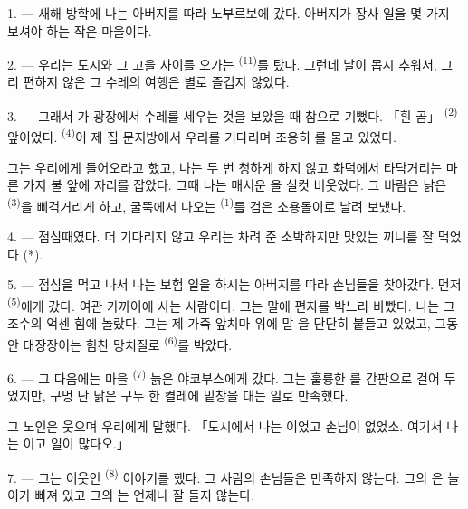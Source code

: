 \VUsaut{3.0mm}

\VUsaut{4.0mm}

1. --- 새해 방학에 나는 아버지를 따라 노부르보에 갔다. 아버지가 장사 일을 몇 가지
보셔야 하는 작은 마을이다.

2. --- 우리는 도시와 그 고을 사이를 오가는  \textsuperscript{(11)}를
탔다. 그런데 날이 몹시 추워서, 그리 편하지 않은 그 수레의 여행은 별로 즐겁지 않았다.

3. --- 그래서 가 광장에서 수레를 세우는 것을 보았을 때 참으로 기뻤다.
「흰 곰」  \textsuperscript{(2)} 앞이었다. 
\textsuperscript{(4)}이 제 집 문지방에서 우리를 기다리며 조용히 를
물고 있었다.

그는 우리에게 들어오라고 했고, 나는 두 번 청하게 하지 않고 화덕에서 타닥거리는 마른
가지 불 앞에 자리를 잡았다. 그때 나는 매서운 을 실컷 비웃었다. 그 바람은
낡은  \textsuperscript{(3)}을 삐걱거리게 하고, 굴뚝에서 나오는
 \textsuperscript{(1)}를 검은 소용돌이로 날려 보냈다.

4. --- 점심때였다. 더 기다리지 않고 우리는 차려 준 소박하지만 맛있는 끼니를 잘 먹었다 (*).

\VUsaut{3.0mm}

5. --- 점심을 먹고 나서 나는 보험 일을 하시는 아버지를 따라 손님들을 찾아갔다. 먼저
 \textsuperscript{(5)}에게 갔다. 여관 가까이에 사는 사람이다. 그는 말에
편자를 박느라 바빴다. 나는 그 조수의 억센 힘에 놀랐다. 그는 제 가죽 앞치마 위에 말
을 단단히 붙들고 있었고, 그동안 대장장이는 힘찬 망치질로 
\textsuperscript{(6)}를 박았다.

6. --- 그 다음에는 마을  \textsuperscript{(7)} 늙은 야코부스에게 갔다.
그는 훌륭한 를 간판으로 걸어 두었지만, 구멍 난 낡은 구두 한 켤레에 밑창을
대는 일로 만족했다.

그 노인은 웃으며 우리에게 말했다. 「도시에서 나는 이었고
손님이 없었소. 여기서 나는 이고 일이 많다오.」

7. --- 그는 이웃인  \textsuperscript{(8)} 이야기를 했다. 그 사람의 손님들은
만족하지 않는다. 그의 은 늘 이가 빠져 있고 그의 는 언제나
잘 들지 않는다.

